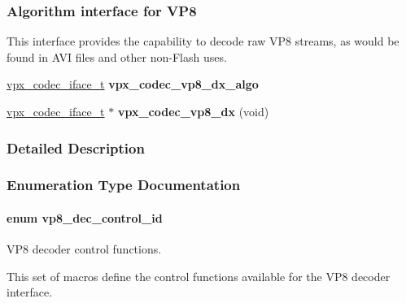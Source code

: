 \subsubsection*{Algorithm interface for V\-P8}
\label{_amgrp0b829b38ff2e659173b35cd78e0735bd}%
 This interface provides the capability to decode raw V\-P8 streams, as would be found in A\-V\-I files and other non-\/\-Flash uses. \begin{DoxyCompactItemize}
\item 
\hypertarget{group__vp8__decoder_ga1e151f9094620511e7aa49c04bf8b79e}{\hyperlink{group__codec_gad654f3da60151f5dfef70aca00ef1e9e}{vpx\-\_\-codec\-\_\-iface\-\_\-t} {\bfseries vpx\-\_\-codec\-\_\-vp8\-\_\-dx\-\_\-algo}}\label{group__vp8__decoder_ga1e151f9094620511e7aa49c04bf8b79e}

\item 
\hypertarget{group__vp8__decoder_ga105d15fdb6baef8a2f02d6d5283847fb}{\hyperlink{group__codec_gad654f3da60151f5dfef70aca00ef1e9e}{vpx\-\_\-codec\-\_\-iface\-\_\-t} $\ast$ {\bfseries vpx\-\_\-codec\-\_\-vp8\-\_\-dx} (void)}\label{group__vp8__decoder_ga105d15fdb6baef8a2f02d6d5283847fb}

\end{DoxyCompactItemize}


\subsubsection{Detailed Description}


\subsubsection{Enumeration Type Documentation}
\hypertarget{group__vp8__decoder_gaf9dd3f2e6d1412106ee791af768e57c1}{
\paragraph[{vp8\-\_\-dec\-\_\-control\-\_\-id}]{\setlength{\rightskip}{0pt plus 5cm}enum {\bf vp8\-\_\-dec\-\_\-control\-\_\-id}}}\label{group__vp8__decoder_gaf9dd3f2e6d1412106ee791af768e57c1}


V\-P8 decoder control functions. 

This set of macros define the control functions available for the V\-P8 decoder interface.

